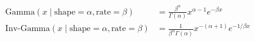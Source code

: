 \documentclass{article}
\begin{document}
\begin{flushleft}



\begin{align*}
\text{Gamma}(x \mid \text{shape} = \alpha, \text{rate} = \beta) &= \frac{\beta^\alpha}{\Gamma(\alpha)} x^{\alpha - 1} e^{- \beta x} \\
\text{Inv-Gamma}(x \mid \text{shape} = \alpha, \text{rate} = \beta) &= \frac{1}{\beta^\alpha \Gamma(\alpha)} x^{-(\alpha + 1)} e^{-1/ \beta x}
\end{align*}


\end{flushleft}
\end{document}
